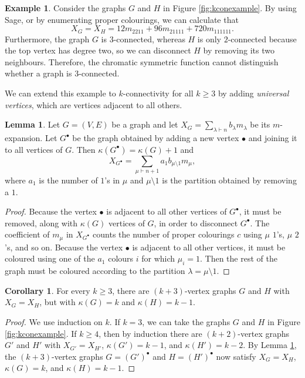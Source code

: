 \documentclass[12pt]{amsart}  %
\theoremstyle{definition}
\newtheorem{lemma}[theorem]{Lemma}
\newtheorem{corollary}[theorem]{Corollary}
\newtheorem{example}[theorem]{Example}
\theoremstyle{remark}
\numberwithin{equation}{section}
\begin{document}
\begin{example}
Consider the graphs $G$ and $H$ in Figure \ref{fig:kconexample}. By using Sage, or by enumerating proper colourings, we can calculate that
\begin{equation*}
X_G=X_H=12m_{2211}+96m_{21111}+720m_{111111}.
\end{equation*}
Furthermore, the graph $G$ is $3$-connected, whereas $H$ is only $2$-connected because the top vertex has degree two, so we can disconnect $H$ by removing its two neighbours. Therefore, the chromatic symmetric function cannot distinguish whether a graph is $3$-connected.
\end{example}

We can extend this example to $k$-connectivity for all $k\geq 3$ by adding \emph{universal vertices}, which are vertices adjacent to all others.

\begin{lemma}\label{lem:universal}
Let $G=(V,E)$ be a graph and let $X_G=\sum_{\lambda\vdash n} b_\lambda m_\lambda$ be its $m$-expansion. Let $G^\bullet$ be the graph obtained by adding a new vertex $\bullet$ and joining it to all vertices of $G$. Then $\kappa(G^\bullet)=\kappa(G)+1$ and 
\begin{equation*}
X_{G^\bullet}=\sum_{\mu\vdash n+1} a_1 b_{\mu\setminus 1}m_\mu,
\end{equation*}
where $a_1$ is the number of $1$'s in $\mu$ and $\mu\setminus 1$ is the partition obtained by removing a $1$.
\end{lemma}

\begin{proof}
Because the vertex $\bullet$ is adjacent to all other vertices of $G^\bullet$, it must be removed, along with $\kappa(G)$ vertices of $G$, in order to disconnect $G^\bullet$. The coefficient of $m_\mu$ in $X_{G^\bullet}$ counts the number of proper colourings $c$ using $\mu$ $1$'s, $\mu$ $2$'s, and so on. Because the vertex $\bullet$ is adjacent to all other vertices, it must be coloured using one of the $a_1$ colours $i$ for which $\mu_i=1$. Then the rest of the graph must be coloured according to the partition $\lambda=\mu\setminus 1$.
\end{proof}

\begin{corollary}
For every $k\geq 3$, there are $(k+3)$-vertex graphs $G$ and $H$ with $X_G=X_H$, but with $\kappa(G)=k$ and $\kappa(H)=k-1$.
\end{corollary}

\begin{proof}
We use induction on $k$. If $k=3$, we can take the graphs $G$ and $H$ in Figure \ref{fig:kconexample}. If $k\geq 4$, then by induction there are $(k+2)$-vertex graphs $G'$ and $H'$ with $X_{G'}=X_{H'}$, $\kappa(G')=k-1$, and $\kappa(H')=k-2$. By Lemma \ref{lem:universal}, the $(k+3)$-vertex graphs $G=(G')^\bullet$ and $H=(H')^\bullet$ now satisfy $X_G=X_H$, $\kappa(G)=k$, and $\kappa(H)=k-1$.
\end{proof}
\end{document}
